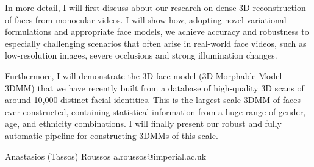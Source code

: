 \documentclass{article}
\begin{document}
In more detail, I will first discuss about our research on dense 3D
reconstruction of faces from monocular videos. I will show how, adopting novel
variational formulations and appropriate face models, we achieve accuracy and
robustness to especially challenging scenarios that often arise in real-world
face videos, such as low-resolution images, severe occlusions and strong
illumination changes.

Furthermore, I will demonstrate the 3D face model (3D Morphable Model - 3DMM)
that we have recently built from a database of high-quality 3D scans of around
10,000 distinct facial identities. This is the largest-scale 3DMM of faces ever
constructed, containing statistical information from a huge range of gender,
age, and ethnicity combinations. I will finally present our robust and fully
automatic pipeline for constructing 3DMMs of this scale.


Anastasios (Tassos) Roussos
a.roussos@imperial.ac.uk
\end{document}
